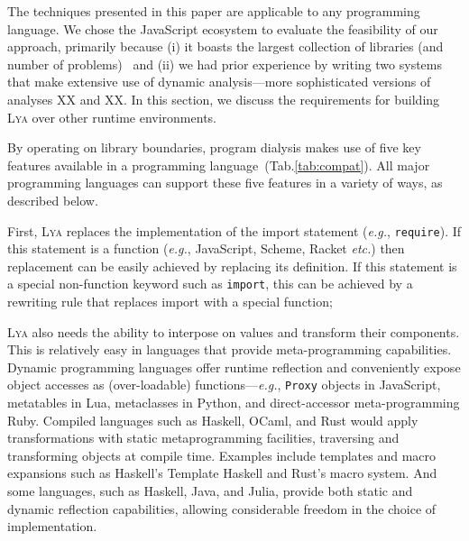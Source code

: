 \documentclass[letterpaper,twocolumn,10pt]{article}
\def\eg{{\em e.g.}, }
\def\etc{{\em etc.}\xspace}
\newcommand{\ttt}[1]{\texttt{#1}}
\newcommand{\tb}[1]{(Tab.\ref{tab:#1})}
\newcommand{\sys}{{\scshape Lya}\xspace}
\newcommand{\fixme}[1]{{\color{red}#1}}
\begin{document}
The techniques presented in this paper are applicable to any programming language.
We chose the JavaScript ecosystem to evaluate the feasibility of our approach, primarily because
  (i) it boasts the largest collection of libraries (and number of problems)~\cite{modulecounts} and
	(ii) we had prior experience by writing two systems that make extensive use of dynamic analysis---more sophisticated versions of analyses \fixme{XX} and \fixme{XX}.
In this section, we discuss the requirements for building \sys over other runtime environments.

By operating on library boundaries, program dialysis makes use of five key features available in a programming language~\tb{compat}.
All major programming languages can support these five features in a variety of ways, as described below.

First, \sys replaces the implementation of the import statement (\eg \ttt{require}).
If this statement is a function (\eg JavaScript, Scheme, Racket \etc) then replacement can be easily achieved by replacing its definition.
If this statement is a special non-function keyword such as \ttt{import}, this can be achieved by a rewriting rule that replaces import with a special function;

\sys also needs the ability to interpose on values and transform their components.
This is relatively easy in languages that provide meta-programming capabilities.
Dynamic programming languages offer runtime reflection and conveniently expose object accesses as (over-loadable) functions---\eg \ttt{Proxy} objects in JavaScript, metatables in Lua, metaclasses in Python, and direct-accessor meta-programming Ruby.
Compiled languages such as Haskell, OCaml, and Rust would apply transformations with static metaprogramming facilities, traversing and transforming objects at compile time.
Examples include templates and macro expansions such as Haskell's Template Haskell and Rust's macro system.
And some languages, such as Haskell, Java, and Julia, provide both static and dynamic reflection capabilities, allowing considerable freedom in the choice of implementation.
\end{document}
